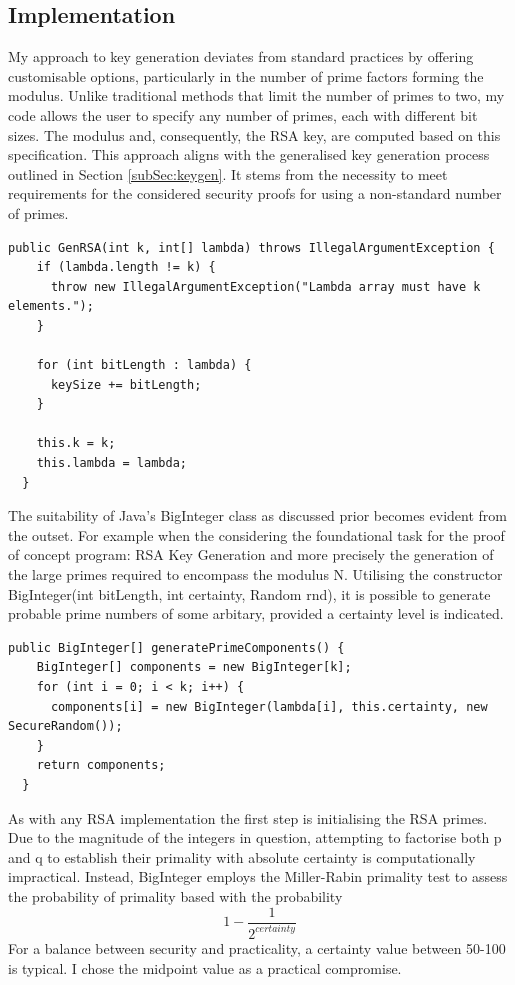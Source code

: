 \documentclass[]{final_report}
\theoremstyle{definition}
\begin{document}
\subsection{Implementation}
My approach to key generation deviates from standard practices by offering customisable options, particularly in the number of prime factors forming the modulus. Unlike traditional methods that limit the number of primes to two, my code allows the user to specify any number of primes, each with different bit sizes. The modulus and, consequently, the RSA key, are computed based on this specification. This approach aligns with the generalised key generation process outlined in Section \ref{subSec:keygen}. It stems from the necessity to meet requirements for the considered security proofs for using a non-standard number of primes.

\begin{lstlisting}[caption=Initialisation of parametrisable Key Generation]
public GenRSA(int k, int[] lambda) throws IllegalArgumentException {
    if (lambda.length != k) {
      throw new IllegalArgumentException("Lambda array must have k elements.");
    }

    for (int bitLength : lambda) {
      keySize += bitLength;
    }

    this.k = k;
    this.lambda = lambda;
  }
 \end{lstlisting}
 
The suitability of Java's BigInteger class as discussed prior becomes evident from the outset. For example when the considering the foundational task for the proof of concept program: RSA Key Generation and more precisely the generation of the large primes required to encompass the modulus N.
Utilising the constructor BigInteger(int bitLength, int certainty, Random rnd), it is possible to generate probable prime numbers of some arbitary, provided a certainty level is indicated.
\begin{lstlisting}[caption=Parametrisable Prime Generation with BigInteger]
public BigInteger[] generatePrimeComponents() {
    BigInteger[] components = new BigInteger[k];
    for (int i = 0; i < k; i++) {
      components[i] = new BigInteger(lambda[i], this.certainty, new SecureRandom());
    }
    return components;
  }
\end{lstlisting}
As with any RSA implementation the first step is initialising the RSA primes. 
Due to the magnitude of the integers in question, attempting to factorise both p and q to establish their primality with absolute certainty is computationally impractical. Instead, BigInteger employs the Miller-Rabin primality test to assess the probability of primality based with the probability  \[ 1 - \frac{1}{2^{certainty}}\]
For a balance between security and practicality, a certainty value between 50-100 is typical. I chose the midpoint value as a practical compromise.
\end{document}
